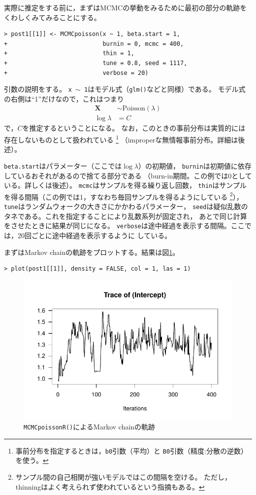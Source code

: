 \documentclass[11pt,uplatex]{jsarticle}
\begin{document}
実際に推定をする前に，まずはMCMCの挙動をみるために最初の部分の軌跡を
くわしくみてみることにする。
\begin{lstlisting}
> post1[[1]] <- MCMCpoisson(x ~ 1, beta.start = 1,
+                           burnin = 0, mcmc = 400,
+                           thin = 1,
+                           tune = 0.8, seed = 1117,
+                           verbose = 20)
\end{lstlisting}
引数の説明をする。
\texttt{x $\sim$ 1}はモデル式（\texttt{glm()}などと同様）である。
モデル式の右側は``1''だけなので，これはつまり
\begin{align*}
\bm{X} &\sim \mathrm{Poisson}(\lambda)
\\
\log\lambda &= C
\end{align*}
で，$C$を推定するということになる。
なお，このときの事前分布は実質的には存在しないものとして扱われている
\footnote{事前分布を指定するときは，\texttt{b0}引数（平均）と
\texttt{B0}引数（精度:分散の逆数）を使う。}
（improperな無情報事前分布。詳細は後述）。

\texttt{beta.start}はパラメーター（ここでは$\log\lambda$）の初期値，
\texttt{burnin}は初期値に依存しているおそれがあるので捨てる部分である
（burn-in期間。この例では0としている。詳しくは後述）。
\texttt{mcmc}はサンプルを得る繰り返し回数，
\texttt{thin}はサンプルを得る間隔（この例では1，すなわち毎回サンプルを得るようにしている
\footnote{サンプル間の自己相関が強いモデルではこの間隔を空ける。
ただし，thinningはよく考えられず使われているという指摘もある\cite{Link2012}。}），
\texttt{tune}はランダムウォークの大きさにかかわるパラメーター，
\texttt{seed}は疑似乱数のタネである。これを指定することにより乱数系列が固定され，
あとで同じ計算をさせたときに結果が同じになる。
\texttt{verbose}は途中経過を表示する間隔。ここでは，20回ごとに途中経過を表示するように
している。

まずはMarkov chainの軌跡をプロットする。結果は図\ref{MCMCpoisson_plot}。

\begin{lstlisting}
> plot(post1[[1]], density = FALSE, col = 1, las = 1)
\end{lstlisting}
%
\begin{figure}[hbtp]
  \begin{center}
    \includegraphics[bb=0 0 360 240, clip, width=240 bp]{example1-1.pdf}
  \end{center}
  \caption{\texttt{MCMCpoissonR()}によるMarkov chainの軌跡}
  \label{MCMCpoisson_plot}
\end{figure}
\end{document}
